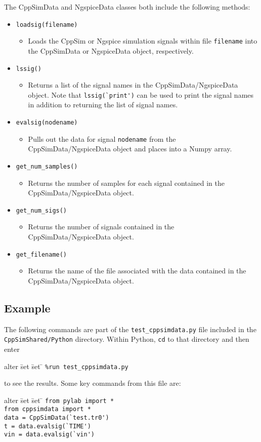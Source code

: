 \documentclass [dvips,12pt]{article}
\newcommand{\bi}{\begin{itemize}}
\newcommand{\ei}{\end{itemize}}
\newcommand{\bt}{\vspace{-.1in} \begin{tabbing} alter \= set \= set \= \kill}
\newcommand{\et}{\end{tabbing} \vspace{-.06in}}
\begin{document}
The CppSimData and NgspiceData classes both include the following methods:
\bi
\item \verb|loadsig(filename)|
  \bi
    \item  Loads the CppSim or Ngspice simulation signals within file \verb|filename| into the CppSimData or NgspiceData object, respectively.
  \ei
\item \verb|lssig()|
  \bi
    \item Returns a list of
          the signal names in the CppSimData/NgspiceData object.  Note that \verb|lssig(`print')| can be used
          to print the signal names in addition to returning the list of signal names. 
  \ei
\item \verb|evalsig(nodename)|
  \bi
    \item Pulls out the data for signal \verb|nodename| 
          from the CppSimData/NgspiceData object and
          places into a Numpy array.  
  \ei
\item \verb|get_num_samples()|
  \bi
    \item Returns the number of samples for each signal contained in 
          the CppSimData/NgspiceData object. 
  \ei
\item \verb|get_num_sigs()|
  \bi
    \item Returns the number of signals contained in
          the CppSimData/NgspiceData object.  
  \ei
\item \verb|get_filename()|
  \bi
    \item Returns the name of the file associated with the data contained in
          the CppSimData/NgspiceData object.  
  \ei
\ei

\subsection*{Example}

  The following commands are part of the \verb|test_cppsimdata.py| file included in the 
\verb|CppSimShared/Python| directory.  Within Python, \verb|cd| to that directory and
 then enter
\bt
\> \verb|%run test_cppsimdata.py|
\et
to see the results. Some key commands from this file are:

\bt
  \> \verb|from pylab import *| \\
  \> \verb|from cppsimdata import *| \\
  \> \verb|data = CppSimData(`test.tr0')| \\
  \> \verb|t = data.evalsig(`TIME')| \\
  \> \verb|vin = data.evalsig(`vin')|
\et
\end{document}
